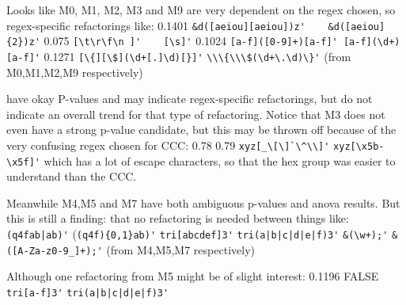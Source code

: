 Looks like M0, M1, M2, M3 and M9 are very dependent on the regex chosen, so regex-specific refactorings like:
0.1401 \verb!&d([aeiou][aeiou])z'    &d([aeiou]{2})z'!
0.075   \verb![\t\r\f\n ]'    [\s]'!
0.1024  \verb![a-f]([0-9]+)[a-f]' [a-f](\d+)[a-f]'!
0.1271  \verb![\{][\$](\d+[.]\d)[}]'!
\verb!\\\{\\\$(\d+\.\d)\}'!
(from M0,M1,M2,M9 respectively)

have okay P-values and may indicate regex-specific refactorings, but do not indicate an overall trend for that type of refactoring.
Notice that M3 does not even have a strong p-value candidate, but this may be thrown off because of the very confusing regex chosen for CCC:
0.78    0.79
\verb!xyz[_\[\]`\^\\]'!    \verb!xyz[\x5b-\x5f]'!
which has a lot of escape characters, so that the hex group was easier to understand than the CCC.



Meanwhile M4,M5 and M7 have both ambiguous p-values and anova results.  But this is still a finding: that no refactoring is needed between things like:
\verb!(q4fab|ab)'! (\verb!(q4f){0,1}ab)'!
\verb!tri[abcdef]3'!   \verb!tri(a|b|c|d|e|f)3'!
\verb!&(\w+);'!    \verb!&([A-Za-z0-9_]+);'!
(from M4,M5,M7 respectively)

Although one refactoring from M5 might be of slight interest:
0.1196  FALSE   \verb!tri[a-f]3'!  \verb!tri(a|b|c|d|e|f)3'!

